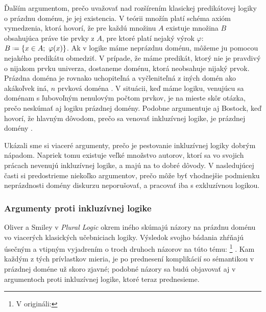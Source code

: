 \documentclass[12pt, letterpaper]{article}
\newcommand*{\defeq}{\mathrel{\vcenter{\baselineskip0.5ex \lineskiplimit0pt
                     \hbox{\scriptsize.}\hbox{\scriptsize.}}}%
                     =}
\begin{document}
Ďalším argumentom, prečo uvažovať nad rozšírením klasickej predikátovej logiky o prázdnu doménu, je jej existencia. V teórii množín platí schéma axióm vymedzenia, ktorá hovorí, že pre každú množinu $A$ existuje množina $B$ obsahujúca práve tie prvky z $A$, pre ktoré platí nejaký výrok $\varphi$: $B \defeq \{x \in A;\text{ } \varphi(x)\}$. Ak v logike máme neprázdnu doménu, môžeme ju pomocou nejakého predikátu obmedziť. V prípade, že máme predikát, ktorý nie je pravdivý o nijakom prvku univerza, dostaneme doménu, ktorá neobsahuje nijaký prvok. Prázdna doména je rovnako uchopiteľná a vyčleniteľná z iných domén ako akákoľvek iná, $n$ prvková doména \parencites[3]{williamson_note_1999}. V situácii, keď máme logiku, venujúcu sa doménam s ľubovoľným nenulovým počtom prvkov, je na mieste skôr otázka, prečo neskúmať aj logiku prázdnej domény. Podobne argumentuje aj Bostock, keď hovorí, že hlavným dôvodom, prečo sa venovať inkluzívnej logike, je  prázdnej domény \parencites[81--82]{bostock_intermediate_1997}.\par

Ukázali sme si viaceré argumenty, prečo je pestovanie inkluzívnej logiky dobrým nápadom. Napriek tomu existuje veľké množstvo autorov, ktorí sa vo svojich prácach nevenujú inkluzívnej logike, a majú na to dobré dôvody. V nasledujúcej časti si predostrieme niekoľko argumentov, prečo môže byť vhodnejšie podmienku neprázdnosti domény diskurzu neporušovať, a pracovať iba s exkluzívnou logikou.

\subsubsection{Argumenty proti inkluzívnej logike}
Oliver a Smiley v \textit{Plural Logic} okrem iného skúmajú názory na prázdnu doménu vo viacerých klasických učebniciach logiky. Výsledok svojho bádania zhŕňajú úsečným a vtipným vyjadrením o troch druhoch názorov na túto tému: \footnote{V origináli: } \parencites[vlastný preklad,][185]{oliver_plural_2016}. Kam každým z tých prívlastkov mieria, je po prednesení komplikácií so sémantikou v prázdnej doméne už skoro zjavné; podobné názory sa budú objavovať aj v argumentoch proti inkluzívnej logike, ktoré teraz prednesieme.\par
\end{document}
